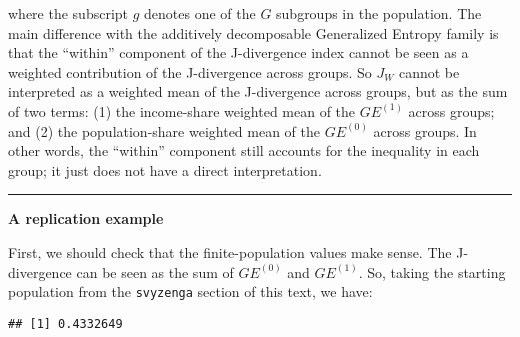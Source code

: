 \documentclass[
]{book}
\newenvironment{Shaded}{\begin{snugshade}}{\end{snugshade}}
\newcommand{\CommentTok}[1]{\textcolor[rgb]{0.56,0.35,0.01}{\textit{#1}}}
\newcommand{\DecValTok}[1]{\textcolor[rgb]{0.00,0.00,0.81}{#1}}
\newcommand{\FunctionTok}[1]{\textcolor[rgb]{0.13,0.29,0.53}{\textbf{#1}}}
\newcommand{\NormalTok}[1]{#1}
\newcommand{\OtherTok}[1]{\textcolor[rgb]{0.56,0.35,0.01}{#1}}
\newcommand{\SpecialCharTok}[1]{\textcolor[rgb]{0.81,0.36,0.00}{\textbf{#1}}}
\begin{document}
\noindent where the subscript \(g\) denotes one of the \(G\) subgroups in the population. The main difference with the additively decomposable Generalized Entropy family is that the ``within'' component of the J-divergence index cannot be seen as a weighted contribution of the J-divergence across groups. So \(J_W\) cannot be interpreted as a weighted mean of the J-divergence across groups, but as the sum of two terms: (1) the income-share weighted mean of the \(GE^{(1)}\) across groups; and (2) the population-share weighted mean of the \(GE^{(0)}\) across groups. In other words, the ``within'' component still accounts for the inequality in each group; it just does not have a direct interpretation.

\begin{center}\rule{0.5\linewidth}{0.5pt}\end{center}

\textbf{A replication example}

First, we should check that the finite-population values make sense. The J-divergence can be seen as the sum of \(GE^{(0)}\) and \(GE^{(1)}\). So, taking the starting population from the \texttt{svyzenga} section of this text, we have:

\begin{Shaded}
\end{Shaded}

\begin{verbatim}
## [1] 0.4332649
\end{verbatim}

\begin{Shaded}
\end{Shaded}
\end{document}
